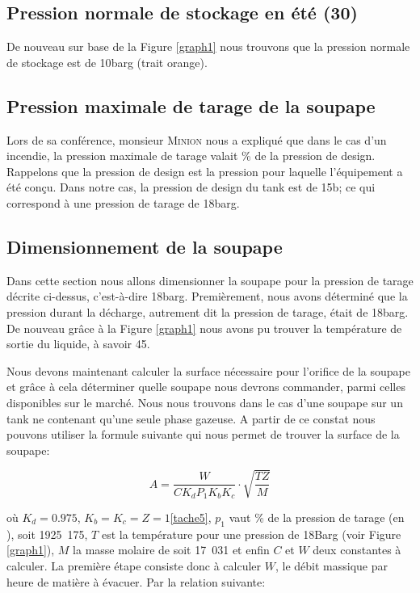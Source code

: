\subsection{Pression normale de stockage en été (\unit{30}{\celsius})}

De nouveau sur base de la Figure \ref{graph1} nous trouvons que la pression normale de stockage est de \unit{10}{barg} (trait orange).

\subsection{Pression maximale de tarage de la soupape}

Lors de sa conférence, monsieur \textsc{Minion} nous a expliqué que dans le cas d'un incendie, la pression maximale de tarage valait  \% de la pression de design. Rappelons que la pression de design est la pression pour laquelle l'équipement a été conçu. Dans notre cas, la pression de design du tank est de \unit{15}{b}; ce qui correspond à une pression de tarage de \unit{18}{barg}.

\subsection{Dimensionnement de la soupape}

Dans cette section nous allons dimensionner la soupape pour la pression de tarage décrite ci-dessus, c'est-à-dire \unit{18}{barg}.
Premièrement, nous avons déterminé que la pression durant la décharge, autrement dit la pression de tarage, était de \unit{18}{barg}. De nouveau grâce à la Figure \ref{graph1} nous avons pu trouver la température de sortie du liquide, à savoir \unit{45}{\celsius}.

Nous devons maintenant calculer la surface nécessaire pour l'orifice de la soupape et grâce à cela déterminer quelle soupape nous devrons commander, parmi celles disponibles sur le marché. Nous nous trouvons dans le cas d'une soupape sur un tank ne contenant qu'une seule phase gazeuse. A partir de ce constat nous pouvons utiliser la formule suivante qui nous permet de trouver la surface de la soupape:

\begin{equation}
A=\dfrac{W}{CK_dP_1K_bK_c}\cdot \sqrt{\dfrac{TZ}{M}}
\label{1}
\end{equation}

où $K_d=0.975$, $K_b=K_c=Z=1$\ref{tache5}, $p_1$ vaut  \% de la pression de tarage (en \bbar), soit \unit{1925.175}{\kilo \pascal}, $T$ est la température pour une pression de \unit{18}{Barg} (voir Figure \ref{graph1}), $M$ la masse molaire de  soit \unit{17.031}{\gram \per \mole} et enfin $C$ et $W$ deux constantes à calculer. La première étape consiste donc à calculer $W$, le débit massique par heure de matière à évacuer. Par la relation suivante:

